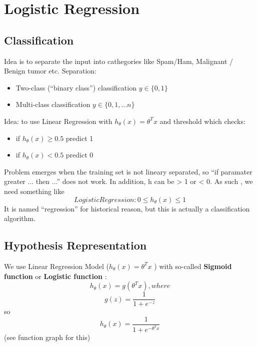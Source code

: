 \documentclass{scrartcl}
\begin{document}
\label {Chapter 6}
\section {Logistic Regression}
\subsection{Classification}
Idea is to separate the input into cathegories like Spam/Ham,
Malignant / Benign tumor etc. Separation: \begin{itemize}
\item {Two-class} (``binary class'') classification $y \in \{0, 1\}$
\item {Multi-class} classification $y \in \{0, 1, ... n\}$
\end{itemize}
Idea: to use Linear Regression with $h_\theta(x) = \theta^T x$ and
threshold which checks: \begin{itemize}
\item{if $h_\theta(x) \geq 0.5$} predict 1
\item{if $h_\theta(x) < 0.5$} predict 0
\end{itemize}
Problem emerges when the training set is not lineary separated, so
``if paramater greater ... then ...'' does not work. In addition, h
can be > 1 or < 0. As such , we need something like \[ Logistic
Regression: 0 \leq h_\theta(x) \leq 1
\]
It is named ``regression'' for historical reason, but this is actually
a classification algorithm.

\subsection{Hypothesis Representation}
We use Linear Regression Model ($h_\theta(x) = \theta^Tx$ ) with
so-called {\bf Sigmoid function} or {\bf Logistic function} : \[
h_\theta(x) = g(\theta^Tx), where \]
\[g(z) = \frac{1}{1 + e^{-z}}\] so
\begin{equation*}
  h_\theta(x) = \frac{1}{1 + e^{-\theta^Tx}}
\end{equation*}
(see function graph for this)
\end{document}
